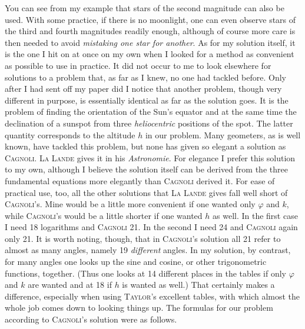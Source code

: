 You can see from my example that stars of the second magnitude can also be used. With some practice, if there is no moonlight, one can even observe stars of the third and fourth magnitudes readily enough, although of course more care is then needed to avoid \emph{mistaking one star for another}. As for my solution itself, it is the one I hit on at once on my own when I looked for a method as convenient as possible to use in practice. It did not occur to me to look elsewhere for solutions to a problem that, as far as I knew, no one had tackled before. Only after I had sent off my paper did I notice that another problem, though very different in purpose, is essentially identical as far as the solution goes. It is the problem of finding the orientation of the Sun’s equator and at the same time the declination of a sunspot from three \emph{heliocentric} positions of the spot. The latter quantity corresponds to the altitude $h$ in our problem. Many geometers, as is well known, have tackled this problem, but none has given so elegant a solution as \textsc{Cagnoli}. \textsc{La Lande} gives it in his \textit{Astronomie}. For elegance I prefer this solution to my own, although I believe the solution itself can be derived from the three fundamental equations more elegantly than \textsc{Cagnoli} derived it. For ease of practical use, too, all the other solutions that \textsc{La Lande} gives fall well short of \textsc{Cagnoli}’s. Mine would be a little more convenient if one wanted only $\varphi$ and $k$, while \textsc{Cagnoli}’s would be a little shorter if one wanted $h$ as well. In the first case I need 18 logarithms and \textsc{Cagnoli} 21. In the second I need 24 and \textsc{Cagnoli} again only 21. It is worth noting, though, that in \textsc{Cagnoli}’s solution all 21 refer to almost as many angles, namely 19 \emph{different} angles. In my solution, by contrast, for many angles one looks up the sine and cosine, or other trigonometric functions, together. (Thus one looks at 14 different places in the tables if only $\varphi$ and $k$ are wanted and at 18 if $h$ is wanted as well.) That certainly makes a difference, especially when using \textsc{Taylor}’s excellent tables, with which almost the whole job comes down to looking things up. The formulas for our problem according to \textsc{Cagnoli}’s solution were as follows.

